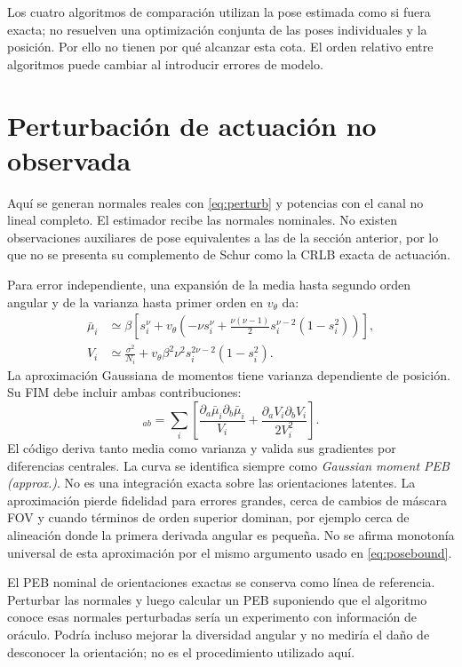 \documentclass[11pt,a4paper]{article}
\begin{document}
Los cuatro algoritmos de comparación utilizan la pose estimada como si fuera exacta; no resuelven una optimización conjunta de las poses individuales y la posición. Por ello no tienen por qué alcanzar esta cota. El orden relativo entre algoritmos puede cambiar al introducir errores de modelo.

\section{Perturbación de actuación no observada}
Aquí se generan normales reales con \eqref{eq:perturb} y potencias con el canal no lineal completo. El estimador recibe las normales nominales. No existen observaciones auxiliares de pose equivalentes a las de la sección anterior, por lo que no se presenta su complemento de Schur como la CRLB exacta de actuación.

Para error independiente, una expansión de la media hasta segundo orden angular y de la varianza hasta primer orden en $v_\theta$ da:
\begin{align}
 \bar\mu_i&\simeq\beta\left[s_i^\nu+v_\theta\left(-\nu s_i^\nu+
 \frac{\nu(\nu-1)}2s_i^{\nu-2}(1-s_i^2)\right)\right],\\
 V_i&\simeq\frac{\sigma^2}{N_i}+v_\theta\beta^2\nu^2s_i^{2\nu-2}(1-s_i^2).
\label{eq:moments}
\end{align}
La aproximación Gaussiana de momentos tiene varianza dependiente de posición. Su FIM debe incluir ambas contribuciones:
\begin{equation}
 [I_{\rm mom}]_{ab}=\sum_i\left[
 \frac{\partial_a\bar\mu_i\partial_b\bar\mu_i}{V_i}
 +\frac{\partial_aV_i\partial_bV_i}{2V_i^2}\right].
\label{eq:momentfim}
\end{equation}
El código deriva tanto media como varianza y valida sus gradientes por diferencias centrales. La curva se identifica siempre como \emph{Gaussian moment PEB (approx.)}. No es una integración exacta sobre las orientaciones latentes. La aproximación pierde fidelidad para errores grandes, cerca de cambios de máscara FOV y cuando términos de orden superior dominan, por ejemplo cerca de alineación donde la primera derivada angular es pequeña. No se afirma monotonía universal de esta aproximación por el mismo argumento usado en \eqref{eq:posebound}.

El PEB nominal de orientaciones exactas se conserva como línea de referencia. Perturbar las normales y luego calcular un PEB suponiendo que el algoritmo conoce esas normales perturbadas sería un experimento con información de oráculo. Podría incluso mejorar la diversidad angular y no mediría el daño de desconocer la orientación; no es el procedimiento utilizado aquí.
\end{document}
